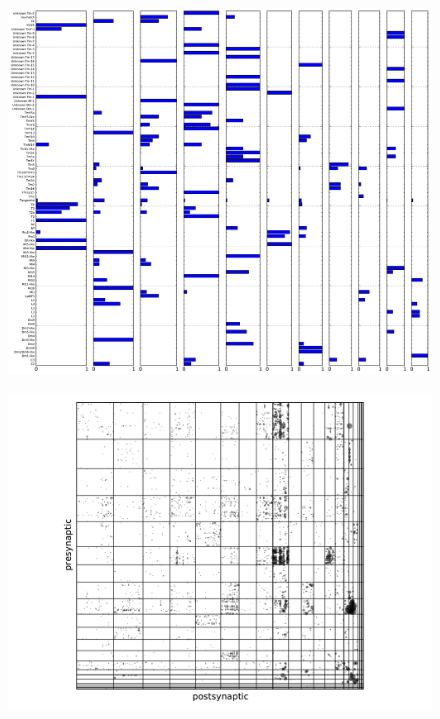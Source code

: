 \documentclass{article}
\begin{document}
\begin{figure}
  \centering
  \includegraphics[width=\textwidth]{drosophila/drosophila.edp.data-fixed_100_200-anneal_slow_400.0.clusters.pdf}
  \caption{}
  \label{fig:drosophila:clusters_edp}
\end{figure}

\begin{figure}
  \centering
  \includegraphics[width=\textwidth]{drosophila/drosophila.edp.data-fixed_100_200-anneal_slow_400.0.latent.pdf}
  \caption{}
  \label{fig:drosophila:latent_edp}
\end{figure}
\end{document}
